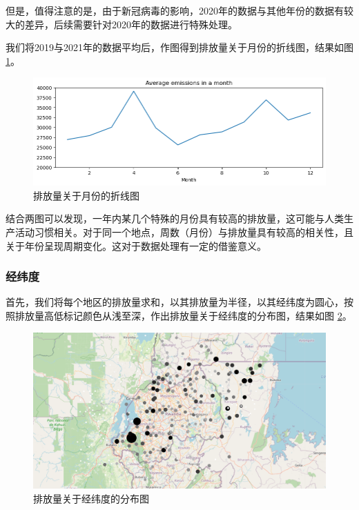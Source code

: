 \documentclass{ctexart}
\begin{document}
但是，值得注意的是，由于新冠病毒的影响，2020年的数据与其他年份的数据有较大的差异，后续需要针对2020年的数据进行特殊处理。

我们将2019与2021年的数据平均后，作图得到排放量关于月份的折线图，结果如图 \ref{fig:3}。

\begin{figure}[H]
      \centering
      \includegraphics[width=1\textwidth]{output3.png}
      \caption{\label{fig:3}排放量关于月份的折线图}
\end{figure}

结合两图可以发现，一年内某几个特殊的月份具有较高的排放量，这可能与人类生产活动习惯相关。对于同一个地点，周数（月份）与排放量具有较高的相关性，且关于年份呈现周期变化。这对于数据处理有一定的借鉴意义。

\subsubsection{经纬度}

首先，我们将每个地区的排放量求和，以其排放量为半径，以其经纬度为圆心，按照排放量高低标记颜色从浅至深，作出排放量关于经纬度的分布图，结果如图 \ref{fig:9}。

\begin{figure}[H]
      \centering
      \includegraphics[width=1\textwidth]{output9.png}
      \caption{\label{fig:9}排放量关于经纬度的分布图}
\end{figure}
\end{document}
